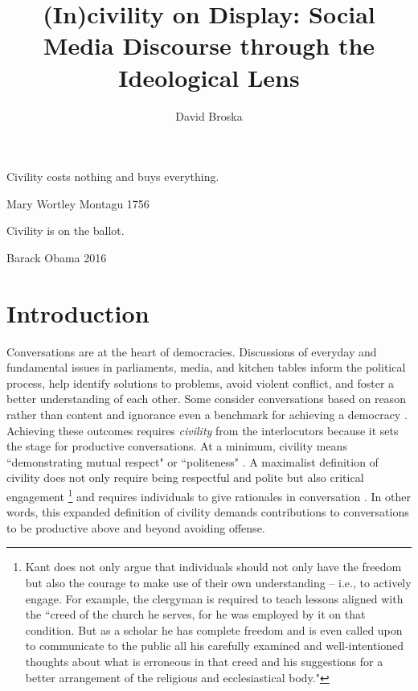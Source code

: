 \documentclass{article}
\title{(In)civility on Display: Social Media Discourse through the Ideological Lens}
\author[1]{David Broska}
\begin{document}
\maketitle

\epigraph{Civility costs nothing and buys everything.}{Mary Wortley Montagu 1756}
\epigraph{Civility is on the ballot.}{Barack Obama 2016}

\section{Introduction}

Conversations are at the heart of democracies. Discussions of everyday and fundamental issues in parliaments, media, and kitchen tables inform the political process, help identify solutions to problems, avoid violent conflict, and foster a better understanding of each other. Some consider conversations based on reason rather than content and ignorance even a benchmark for achieving a democracy \citep{sanders_against_1997}. Achieving these outcomes requires \textit{civility} from the interlocutors because it sets the stage for productive conversations. 
At a minimum,  civility means ``demonstrating mutual respect" \citep{mutz_inyourface_2016} or ``politeness" \citep{frimer_montagu_2018}. A maximalist definition of civility does not only require being respectful and polite but also critical engagement \citep{kant_enlightenment_1784}\footnote{Kant does not only argue that individuals should not only have the freedom but also the courage to make use of their own understanding -- i.e., to actively engage. For example, the clergyman is required to teach lessons aligned with the ``creed of the church he serves, for he was employed by it on that condition. But as a scholar he has complete freedom and is even called upon to communicate to the public all his carefully examined and well-intentioned thoughts about what is erroneous in that creed and his suggestions for a better arrangement of the religious and ecclesiastical body."} and requires individuals to give rationales in conversation \citep{habermas1985theory}. In other words, this expanded definition of civility demands contributions to conversations to be productive above and beyond avoiding offense.
\end{document}
